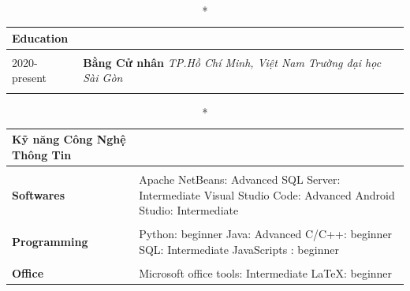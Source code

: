 \documentclass[10pt,oneside]{article}
\newcommand{\experience}[4]
{
    \textbf{#1} \hfill  \faMapMarker \textit{ #3} \newline
    \textit{#2} \newline
    #4 \\ \\ 
}
\begin{document}
\begin{longtable}{p{} p{}}
    \caption*{Education}\\
    \hline\\
    2020-present & \experience{Bằng Cử nhân}{Trường đại học Sài Gòn}{TP.Hồ Chí Minh, Việt Nam}{
    
    }
\end{longtable}



\begin{longtable}{p{} p{}}
    \caption*{Kỹ năng Công Nghệ Thông Tin}\\
    \hline\\
    \textbf{Softwares} & Apache NetBeans: Advanced \newline SQL Server: Intermediate \newline Visual Studio Code: Advanced \newline
    Android Studio: Intermediate \\ \\
    
    \textbf{Programming} & Python: beginner \newline Java: Advanced \newline C/C++:  beginner \newline SQL: Intermediate \newline JavaScripts : beginner \\ \\
    
    \textbf{Office} & Microsoft office tools: Intermediate \newline \LaTeX: beginner \\
    
\end{longtable}
\end{document}
